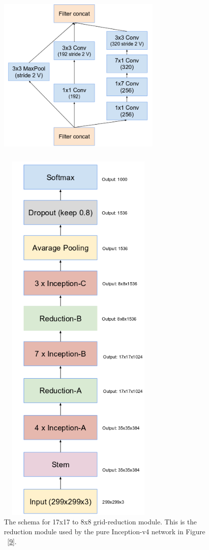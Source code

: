 \documentclass[a4paper,12pt, twoside]{NITKReport}
\begin{document}
\begin{figure}
\centering
\begin{minipage}[b]{0.4\textwidth}
    \includegraphics[height=9cm,width=8cm]{figure8.png}
    \caption{The schema for 17x17 to 8x8 grid-reduction module. This is the reduction module used by the pure Inception-v4 network in Figure ~\ref{9}.}
    \label{8}
  \end{minipage}
  \hfill
  \begin{minipage}[b]{0.4\textwidth}
 \includegraphics[height=19cm,width=8cm]{figure9.png}

\end{minipage}
\end{figure}
\end{document}
